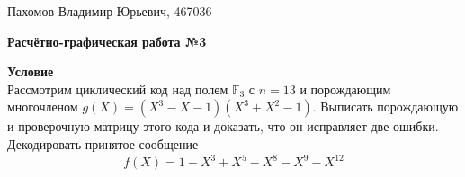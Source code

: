 \documentclass[12pt]{article}
\begin{document}
\begin{flushright}
    Пахомов Владимир Юрьевич, 467036
\end{flushright}

\begin{center}
    \textbf{Расчётно-графическая работа №3}
\end{center}

\begin{flushleft}
    \textbf{Условие} \\
    Рассмотрим циклический код над полем $\mathbb{F}_3$ с $n = 13$ и порождающим многочленом $g(X) = (X^3 - X - 1)(X^3 + X^2 -1 )$. Выписать порождающую и проверочную матрицу этого кода и доказать, что он исправляет две ошибки. 
    Декодировать принятое сообщение
    \[ f(X) = 1 - X^3 + X^5 - X^8 - X^9 - X^{12} \]



\end{flushleft}
\end{document}
